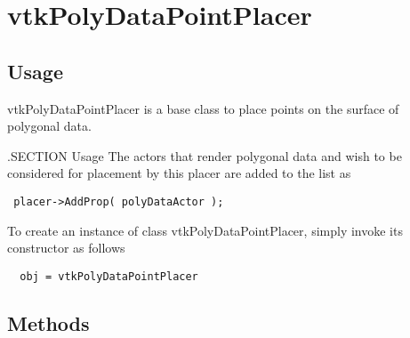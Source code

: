 \section{vtkPolyDataPointPlacer}

\subsection{Usage}

 vtkPolyDataPointPlacer is a base class to place points on the surface of 
 polygonal data.

 .SECTION Usage
 The actors that render polygonal data and wish to be considered 
 for placement by this placer are added to the list as
 \begin{verbatim}
 placer->AddProp( polyDataActor );
 \end{verbatim}


To create an instance of class vtkPolyDataPointPlacer, simply
invoke its constructor as follows
\begin{verbatim}
  obj = vtkPolyDataPointPlacer
\end{verbatim}
\subsection{Methods}

